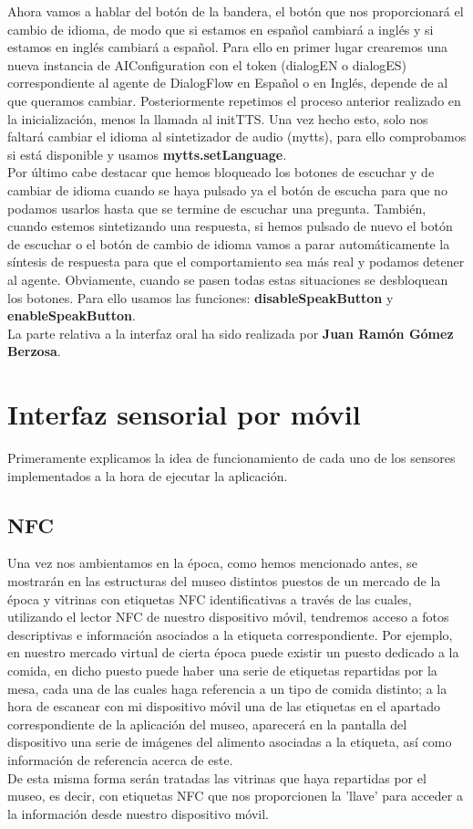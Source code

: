 Ahora vamos a hablar del botón de la bandera, el botón que nos proporcionará el cambio de idioma, de modo que si estamos en español cambiará a inglés y si estamos en inglés cambiará a español. Para ello en primer lugar crearemos una nueva instancia de AIConfiguration con el token (dialogEN o dialogES) correspondiente al agente de DialogFlow en Español o en Inglés, depende de al que queramos cambiar. Posteriormente repetimos el proceso anterior realizado en la inicialización, menos la llamada al initTTS. Una vez hecho esto, solo nos faltará cambiar el idioma al sintetizador de audio (mytts), para ello comprobamos si está disponible y usamos \textbf{mytts.setLanguage}.\\


Por último cabe destacar que hemos bloqueado los botones de escuchar y de cambiar de idioma cuando se haya pulsado ya el botón de escucha para que no podamos usarlos hasta que se termine de escuchar una pregunta. También, cuando estemos sintetizando una respuesta, si hemos pulsado de nuevo el botón de escuchar o el botón de cambio de idioma vamos a parar automáticamente la síntesis de respuesta para que el comportamiento sea más real y podamos detener al agente. Obviamente, cuando se pasen todas estas situaciones se desbloquean los botones. Para ello usamos las funciones: \textbf{disableSpeakButton} y \textbf{enableSpeakButton}. \\

La parte relativa a la interfaz oral ha sido realizada por \textbf{Juan Ramón Gómez Berzosa}.

\section{Interfaz sensorial por móvil}
Primeramente explicamos la idea de funcionamiento de cada uno de los sensores implementados a la hora de ejecutar la aplicación.
\subsection{NFC}
Una vez nos ambientamos en la época, como hemos mencionado antes, se mostrarán en las estructuras del museo distintos puestos de un mercado de la época y vitrinas con etiquetas NFC identificativas a través de las cuales, utilizando el lector NFC de nuestro dispositivo móvil, tendremos acceso a fotos descriptivas e información asociados a la etiqueta correspondiente. Por ejemplo, en nuestro mercado virtual de cierta época puede existir un puesto dedicado a la comida, en dicho puesto puede haber una serie de etiquetas repartidas por la mesa, cada una de las cuales haga referencia a un tipo de comida distinto; a la hora de escanear con mi dispositivo móvil una de las etiquetas en el apartado correspondiente de la aplicación del museo, aparecerá en la pantalla del dispositivo una serie de imágenes del alimento asociadas a la etiqueta, así como información de referencia acerca de este.\\
De esta misma forma serán tratadas las vitrinas que haya repartidas por el museo, es decir, con etiquetas NFC que nos proporcionen la 'llave' para acceder a la información desde nuestro dispositivo móvil.

